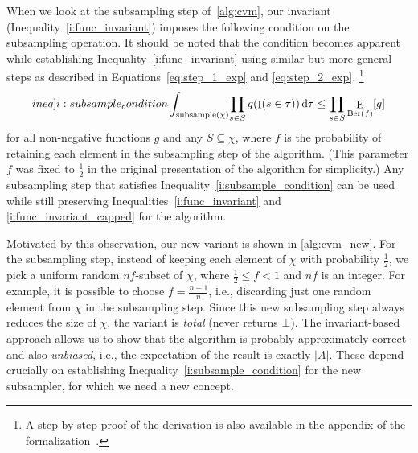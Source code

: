\documentclass[a4paper,UKenglish,cleveref, autoref, thm-restate]{lipics-v2021}
\newcommand{\integral}[3]{\int_{#1} \! #2 \, \mathrm{d} #3}
\DeclareMathOperator{\Ber}{\mathrm{Ber}}
\DeclareMathOperator{\expect}{\mathrm{E}}
\DeclareMathOperator{\indicat}{\mathrm{I}}
\begin{document}
When we look at the subsampling step of~\cref{alg:cvm}, our invariant (Inequality~\ref{i:func_invariant}) imposes the following condition on the subsampling operation.
It should be noted that the condition becomes apparent while establishing Inequality~\ref{i:func_invariant} using similar but more general steps as described in Equations~\ref{eq:step_1_exp} and \ref{eq:step_2_exp}.%
\footnote{A step-by-step proof of the derivation is also available in the appendix of the formalization~\cite[Appendix~A]{CVM_Distinct_Elements-AFP}.}
\begin{equation}\label[ineq]{i:subsample_condition}
  \integral{\mathrm{subsample}(\chi)}{\prod_{s \in S} g(\indicat(s \in \tau))}{\tau} \leq \prod_{s \in S} \expect_{\Ber(f)} [g]
\end{equation}
for all non-negative functions $g$ and any $S \subseteq \chi$, where $f$ is the probability of retaining each element in the subsampling step of the algorithm. (This parameter $f$ was fixed to $\frac{1}{2}$ in the original presentation of the algorithm for simplicity.)
Any subsampling step that satisfies Inequality~\ref{i:subsample_condition} can be used while still preserving Inequalities~\ref{i:func_invariant} and \ref{i:func_invariant_capped} for the algorithm.

Motivated by this observation, our new variant is shown in \cref{alg:cvm_new}.
For the subsampling step, instead of keeping each element of $\chi$ with probability $\frac{1}{2}$, we pick a uniform random $nf$-subset of $\chi$, where $\frac{1}{2} \leq f < 1$ and $nf$ is an integer.
For example, it is possible to choose $f = \frac{n-1}{n}$, i.e., discarding just one random element from $\chi$ in the subsampling step.
Since this new subsampling step always reduces the size of $\chi$, the variant is \emph{total} (never returns $\bot$).
The invariant-based approach allows us to show that the algorithm is probably-approximately correct and also \emph{unbiased}, i.e., the expectation of the result is exactly $|A|$.
These depend crucially on establishing Inequality~\ref{i:subsample_condition} for the new subsampler, for which we need a new concept.
\end{document}
